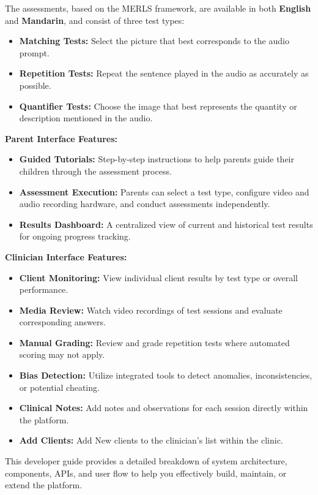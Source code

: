 \documentclass{article}
\begin{document}
The assessments, based on the MERLS framework, are available in both \textbf{English} and \textbf{Mandarin}, and consist of three test types:
\begin{itemize}
    \item \textbf{Matching Tests:} Select the picture that best corresponds to the audio prompt.
    \item \textbf{Repetition Tests:} Repeat the sentence played in the audio as accurately as possible.
    \item \textbf{Quantifier Tests:} Choose the image that best represents the quantity or description mentioned in the audio.
\end{itemize}

\noindent\textbf{Parent Interface Features:}
\begin{itemize}
    \item \textbf{Guided Tutorials:} Step-by-step instructions to help parents guide their children through the assessment process.
    \item \textbf{Assessment Execution:} Parents can select a test type, configure video and audio recording hardware, and conduct assessments independently.
    \item \textbf{Results Dashboard:} A centralized view of current and historical test results for ongoing progress tracking.
\end{itemize}

\noindent\textbf{Clinician Interface Features:}
\begin{itemize}
    \item \textbf{Client Monitoring:} View individual client results by test type or overall performance.
    \item \textbf{Media Review:} Watch video recordings of test sessions and evaluate corresponding answers.
    \item \textbf{Manual Grading:} Review and grade repetition tests where automated scoring may not apply.
    \item \textbf{Bias Detection:} Utilize integrated tools to detect anomalies, inconsistencies, or potential cheating.
    \item \textbf{Clinical Notes:} Add notes and observations for each session directly within the platform.
    \item \textbf{Add Clients:} Add New clients to the clinician's list within the clinic.
\end{itemize}


This developer guide provides a detailed breakdown of system architecture, components, APIs, and user flow to help you effectively build, maintain, or extend the platform.
\end{document}
